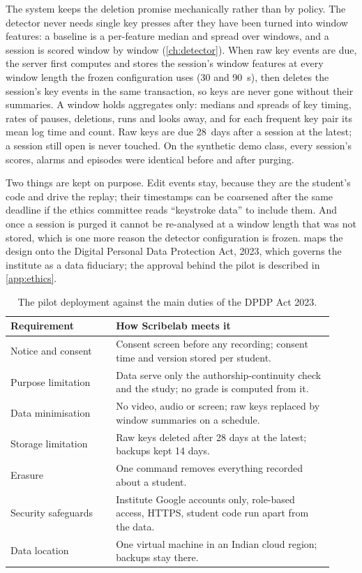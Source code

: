 The system keeps the deletion promise mechanically rather than by policy. The
detector never needs single key presses after they have been turned into
window features: a baseline is a per-feature median and spread over windows,
and a session is scored window by window (\cref{ch:detector}). When raw key
events are due, the server first computes and stores the session's window
features at every window length the frozen configuration uses (30 and
\SI{90}{\second}), then deletes the session's key events in the same
transaction, so keys are never gone without their summaries. A window holds
aggregates only: medians and spreads of key timing, rates of pauses,
deletions, runs and looks away, and for each frequent key pair its mean log
time and count. Raw keys are due 28~days after a session at the latest; a
session still open is never touched. On the synthetic demo class, every
session's scores, alarms and episodes were identical before and after purging.

Two things are kept on purpose. Edit events stay, because they are the
student's code and drive the replay; their timestamps can be coarsened after
the same deadline if the ethics committee reads ``keystroke data'' to include
them. And once a session is purged it cannot be re-analysed at a window length
that was not stored, which is one more reason the detector configuration is
frozen.  maps the design onto the Digital Personal Data
Protection Act, 2023, which governs the institute as a data fiduciary; the
approval behind the pilot is described in \cref{app:ethics}.

\begin{table}[ht]
  \centering\small
  \begin{tabular}{p{0.3\linewidth}p{0.62\linewidth}}
    \toprule
    Requirement & How Scribelab meets it \\
    \midrule
    Notice and consent & Consent screen before any recording; consent time and version stored per student. \\
    Purpose limitation & Data serve only the authorship-continuity check and the study; no grade is computed from it. \\
    Data minimisation & No video, audio or screen; raw keys replaced by window summaries on a schedule. \\
    Storage limitation & Raw keys deleted after 28 days at the latest; backups kept 14 days. \\
    Erasure & One command removes everything recorded about a student. \\
    Security safeguards & Institute Google accounts only, role-based access, HTTPS, student code run apart from the data. \\
    Data location & One virtual machine in an Indian cloud region; backups stay there. \\
    \bottomrule
  \end{tabular}
  \caption{The pilot deployment against the main duties of the DPDP Act 2023.}
  \label{tab:dpdp}
\end{table}

